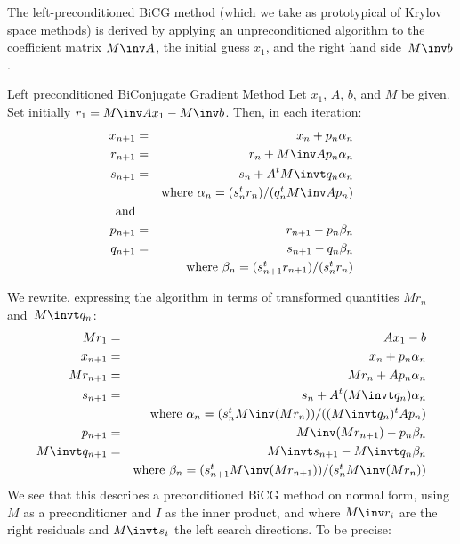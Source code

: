\documentclass[11pt]{artikel3}
\begin{document}
\begin{Outline}
The left-preconditioned BiCG method (which we take as prototypical
of Krylov space methods) is derived by applying an unpreconditioned
algorithm to the coefficient matrix $M\inv A$, the initial guess $x_1$,
and the right hand side~$M\inv b$.
\begin{algorithm}{Left preconditioned BiConjugate Gradient Method}
\label{alg:bicg-left}
Let $x_1$, $A$, $b$, and $M$ be given. 
Set initially $r_1=M\inv Ax_1-M\inv b$. Then, in each iteration:
\begin{eqnarray*}
    x_{n+1}&=&x_n+p_n\alpha_n\\
    r_{n+1}&=&r_n+M\inv Ap_n\alpha_n\\
    s_{n+1}&=&s_n+A^tM\invt q_n\alpha_n\\
    &&\hbox{where $\alpha_n=(s_n^tr_n)/(q_n^tM\inv Ap_n)$}\\
    \hbox{and}\\
    p_{n+1}&=&r_{n+1}-p_n\beta_n\\
    q_{n+1}&=&s_{n+1}-q_n\beta_n\\
    &&\hbox{where $\beta_n=(s_{n+1}^tr_{n+1})/(s_n^tr_n)$}
\end{eqnarray*}
\end{algorithm}
We rewrite, expressing the algorithm in terms of 
transformed quantities $M r_n$ and~$M\invt q_n$:
\begin{eqnarray*}
    M r_1&=&Ax_1-b\\
    x_{n+1}&=&x_n+p_n\alpha_n\\
    M r_{n+1}&=&M r_n+Ap_n\alpha_n\\
    s_{n+1}&=&s_n+A^t(M\invt q_n)\alpha_n\\
    &&\hbox{where $\alpha_n=(s_n^tM\inv(M r_n))/((M\invt q_n)^tAp_n)$}\\
    p_{n+1}&=&M\inv(M r_{n+1})-p_n\beta_n\\
    M\invt q_{n+1}&=&M\invt s_{n+1}-M\invt q_n\beta_n\\
    &&\hbox{where $\beta_n=(s_{n+1}^tM\inv (Mr_{n+1}))/(s_n^tM\inv (Mr_n))$}\\
\end{eqnarray*}
We see that this describes a preconditioned
BiCG method on normal form, using $M$ as a preconditioner and $I$ as
the inner product,
and where $M\inv r_i$ are the right residuals and $M\invt s_i$ the
left search directions. To be precise:


\end{Outline}
\end{document}
